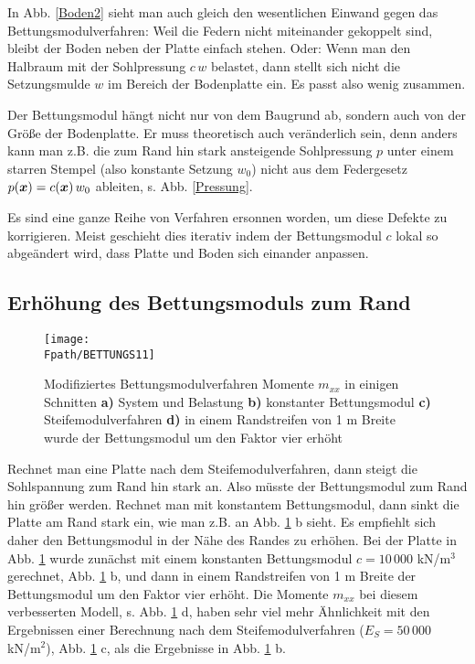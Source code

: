In Abb. \ref{Boden2} sieht man auch gleich den wesentlichen Einwand gegen das Bettungsmodulverfahren: Weil die Federn nicht miteinander gekoppelt sind, bleibt der Boden neben der Platte einfach stehen. Oder: Wenn man den Halbraum mit der Sohlpressung $c\,w$ belastet, dann stellt sich nicht die Setzungsmulde $w$ im Bereich der Bodenplatte ein. Es passt also wenig zusammen.

Der Bettungsmodul h\"{a}ngt nicht nur von dem Baugrund ab, sondern auch von der Gr\"{o}{\ss}e der Bodenplatte. Er muss theoretisch auch ver\"{a}nderlich sein, denn anders kann man z.B. die zum Rand hin stark ansteigende Sohlpressung $p$ unter einem starren Stempel (also konstante Setzung $w_0$) nicht aus dem Federgesetz $p(\mbox{\boldmath $x$})  = c(\mbox{\boldmath $x$}) \,w_0$ ableiten, s. Abb. \ref{Pressung}.

Es sind eine ganze Reihe von Verfahren ersonnen worden, um diese Defekte zu korrigieren. Meist geschieht dies iterativ indem der Bettungsmodul $c$ lokal so abge\"{a}ndert wird, dass Platte und Boden sich einander anpassen.


{\textcolor{sectionTitleBlue}{\subsection{Erh\"{o}hung des Bettungsmoduls zum Rand}}}
\begin{figure}[tbp]
\if {} \sidecaption \fi
\texttt{[image: \\Fpath/BETTUNGS11]}
\caption{Modifiziertes Bettungsmodulverfahren Momente $m_{xx}$ in einigen Schnitten {\bf a)} System und Belastung {\bf b)}
konstanter Bettungsmodul {\bf c)} Steifemodulverfahren {\bf d)} in einem Randstreifen von
1 m Breite wurde der Bettungsmodul um den Faktor vier erh\"{o}ht} \label{BettungS11}
\end{figure}%

Rechnet man eine Platte nach dem Steifemodulverfahren, dann steigt die Sohlspannung zum Rand hin stark an. Also m\"{u}sste der Bettungsmodul zum Rand hin gr\"{o}{\ss}er werden. Rechnet man mit konstantem Bettungsmodul, dann sinkt die Platte am Rand stark ein, wie man z.B. an Abb. \ref{BettungS11} b sieht. Es empfiehlt sich daher den Bettungsmodul in der N\"{a}he des Randes zu erh\"{o}hen. Bei der Platte in Abb. \ref{BettungS11} wurde zun\"{a}chst mit einem konstanten Bettungsmodul $c = 10\,000$ kN/m$^3$ gerechnet, Abb. \ref{BettungS11} b, und dann in einem Randstreifen von 1 m Breite der Bettungsmodul um den Faktor vier erh\"{o}ht. Die Momente $m_{xx}$ bei diesem verbesserten Modell, s. Abb. \ref{BettungS11} d, haben sehr viel mehr \"{A}hnlichkeit mit den Ergebnissen einer Berechnung nach dem Steifemodulverfahren ($E_S = 50\,000$ kN/m$^2$), Abb. \ref{BettungS11} c, als die Ergebnisse in Abb. \ref{BettungS11} b.

